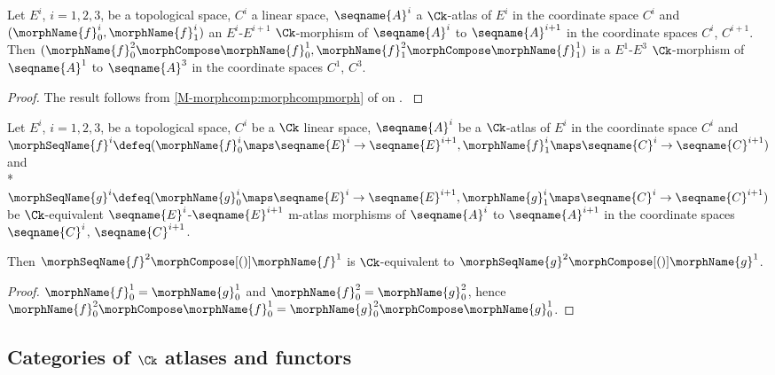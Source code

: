 \documentclass{article}
\begin{document}
\begin{corollary}
\label{cor:Ck-ATLmorph}
Let $E^i$, $i=1,2,3$, be a topological space, $C^i$ a linear space,
$\seqname{A}^i$ a $\Ck$-atlas of $E^i$ in the coordinate space $C^i$ and
$(\morphName{f}^i_0, \morphName{f}^i_1)$ an $E^i$-$E^{i+1}$
$\Ck$-morphism of $\seqname{A}^i$ to $\seqname{A}^{i+1}$ in the
coordinate spaces $C^i$, $C^{i+1}$. Then
$
  (
    \morphName{f}^2_0 \morphCompose \morphName{f}^1_0,
    \morphName{f}^2_1 \morphCompose \morphName{f}^1_1
  )
$
is a $E^1$-$E^3$ $\Ck$-morphism of $\seqname{A}^1$ to $\seqname{A}^3$ in
the coordinate spaces $C^1$, $C^3$.

\begin{proof}
The result follows from
\cref{M-morphcomp:morphcompmorph} of
{
  \showlabelsinline
   on
  .
}
\end{proof}
\end{corollary}

\begin{lemma}
\label{lem:Ck-ATLmorphequiv}
Let $E^i$, $i=1,2,3$, be a topological space,
$C^i$ be a $\Ck$ linear space,
$\seqname{A}^i$ be a $\Ck$-atlas of $E^i$ in the coordinate space $C^i$ and
$
  \morphSeqName{f}^i \defeq
  (
    \morphName{f}^i_0 \maps \seqname{E}^i \to \seqname{E}^{i+1},
    \morphName{f}^i_1 \maps \seqname{C}^i \to \seqname{C}^{i+1}
  )
$
and \\*
$
  \morphSeqName{g}^i \defeq
  (
    \morphName{g}^i_0 \maps \seqname{E}^i \to \seqname{E}^{i+1},
    \morphName{g}^i_1 \maps \seqname{C}^i \to \seqname{C}^{i+1}
  )
$
be $\Ck$-equivalent $\seqname{E}^i$-$\seqname{E}^{i+1}$ m-atlas
morphisms of $\seqname{A}^i$ to $\seqname{A}^{i+1}$ in the coordinate
spaces $\seqname{C}^i$, $\seqname{C}^{i+1}$.

Then $\morphSeqName{f}^2 \morphCompose[()] \morphName{f}^1$ is $\Ck$-equivalent
to $\morphSeqName{g}^2 \morphCompose[()] \morphName{g}^1$.

\begin{proof}
$\morphName{f}^1_0 = \morphName{g}^1_0$ and
$\morphName{f}^2_0 = \morphName{g}^2_0$, hence
$
  \morphName{f}^2_0 \morphCompose \morphName{f}^1_0 =
  \morphName{g}^2_0 \morphCompose \morphName{g}^1_0
$.
\end{proof}
\end{lemma}

\subsection{Categories of $\mathrm{\Ck}$ atlases and functors}
\end{document}
